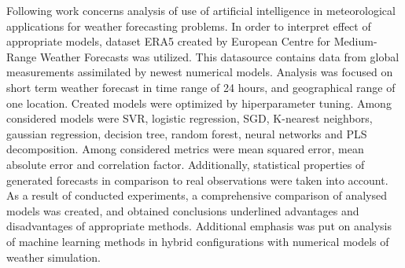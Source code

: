 Following work concerns analysis of use of artificial intelligence in meteorological applications for weather forecasting problems. In order to interpret effect of appropriate models, dataset ERA5 created by European Centre for Medium-Range Weather Forecasts was utilized. This datasource contains data from global measurements assimilated by newest numerical models. Analysis was focused on short term weather forecast in time range of 24 hours, and geographical range of one location. Created models were optimized by hiperparameter tuning.
Among considered models were SVR, logistic regression, SGD, K-nearest neighbors, gaussian regression, decision tree, random forest, neural networks and PLS decomposition.
Among considered metrics were mean squared error, mean absolute error and correlation factor. Additionally, statistical properties of generated forecasts in comparison to real observations were taken into account. As a result of conducted experiments, a comprehensive comparison of analysed models was created, and obtained conclusions underlined advantages and disadvantages of appropriate methods.
Additional emphasis was put on analysis of machine learning methods in hybrid configurations with numerical models of weather simulation.